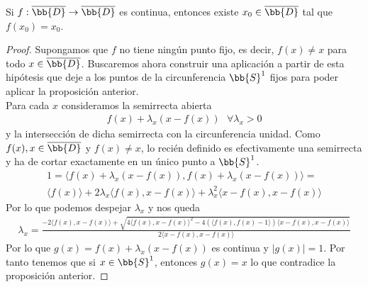 \begin{teo}
    Si $f:\overline{\bb{D}} \to \overline{\bb{D}}$ es continua, entonces existe $x_0\in \overline{\bb{D}}$ tal que $f(x_0)=x_0$.

    \begin{proof}
        Supongamos que $f$ no tiene ningún punto fijo, es decir, $f(x)\neq x$ para todo $x\in \overline{\bb{D}}$. Buscaremos ahora construir una aplicación a partir de esta hipótesis que deje a los puntos de la circunferencia $\bb{S}^1$ fijos para poder aplicar la proposición anterior. \\

        Para cada $x$ consideramos la semirrecta abierta 
        \begin{gather*}
            f(x) + \lambda_x (x-f(x))\ \ \ \forall \lambda_x >0
        \end{gather*}
        y la intersección de dicha semirrecta con la circunferencia unidad. Como $f(x),x\in \overline{\bb{D}}$ y $f(x)\neq x$, lo recién definido es efectivamente una semirrecta y ha de cortar exactamente en un único punto a $\bb{S}^1$.
        \begin{gather*}
            1 = \langle f(x) + \lambda_x (x-f(x)), f(x) + \lambda_x (x-f(x)) \rangle =\\
            \langle f(x) \rangle + 2\lambda_x \langle f(x), x-f(x)\rangle + \lambda_x^2 \langle x-f(x), x-f(x) \rangle
        \end{gather*}
        Por lo que podemos despejar $\lambda_x$ y nos queda
        \begin{gather*}
            \lambda_x = \frac{-2\langle f(x), x-f(x) \rangle + \sqrt{4\langle f(x), x-f(x)\rangle^2 - 4(\langle f(x),f(x)-1\rangle)\langle x-f(x), x-f(x)\rangle}}{2\langle x-f(x), x-f(x) \rangle}
        \end{gather*}
        Por lo que $g(x) = f(x) + \lambda_x(x-f(x))$ es continua y $|g(x)|=1$. Por tanto tenemos que si $x\in \bb{S}^1$, entonces $g(x)=x$ lo que contradice la proposición anterior.
    \end{proof}
\end{teo}

